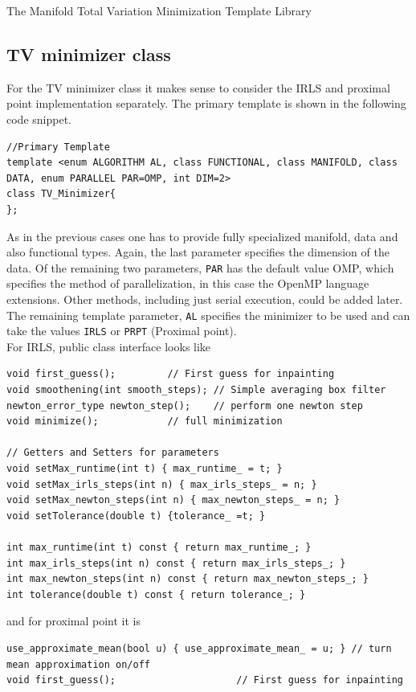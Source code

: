 \begin{chapter}{The Manifold Total Variation Minimization Template Library}
\subsection{TV minimizer class} %
\label{sub:TVMinimizer class}
For the TV minimizer class it makes sense to consider the IRLS and proximal point implementation separately. The primary template is shown in the following code snippet.
\cppinline
\begin{lstlisting}
//Primary Template 
template <enum ALGORITHM AL, class FUNCTIONAL, class MANIFOLD, class DATA, enum PARALLEL PAR=OMP, int DIM=2>
class TV_Minimizer{ 
};
\end{lstlisting}
As in the previous cases one has to provide fully specialized manifold, data and also functional types. Again, the last parameter specifies the dimension of the data. Of the
remaining two parameters, \texttt{PAR} has the default value OMP, which specifies the method of parallelization, in this case the OpenMP language extensions. Other methods, including just serial
execution, could be added later. The remaining template parameter, \texttt{AL} specifies the minimizer to be used and can take the values \texttt{IRLS} or \texttt{PRPT} (Proximal point).\\

For IRLS, public class interface looks like\\
\cppinline
\begin{lstlisting}
void first_guess();		    // First guess for inpainting
void smoothening(int smooth_steps); // Simple averaging box filter
newton_error_type newton_step();    // perform one newton step
void minimize();		    // full minimization

// Getters and Setters for parameters
void setMax_runtime(int t) { max_runtime_ = t; }
void setMax_irls_steps(int n) { max_irls_steps_ = n; }
void setMax_newton_steps(int n) { max_newton_steps_ = n; }
void setTolerance(double t) {tolerance_ =t; }
	    
int max_runtime(int t) const { return max_runtime_; }
int max_irls_steps(int n) const { return max_irls_steps_; }
int max_newton_steps(int n) const { return max_newton_steps_; }
int tolerance(double t) const { return tolerance_; }
\end{lstlisting}

and for proximal point it is\\
\cppinline
\begin{lstlisting}
use_approximate_mean(bool u) { use_approximate_mean_ = u; } // turn mean approximation on/off
void first_guess();					    // First guess for inpainting
 

\end{lstlisting}
\end{chapter}
